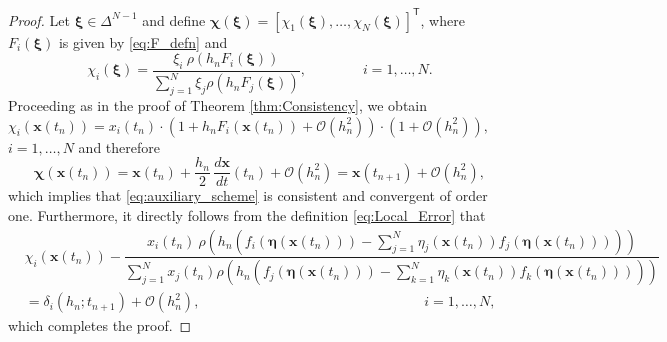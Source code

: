 \documentclass[11pt,letterpaper]{article}
\theoremstyle{remark}
\begin{document}
\begin{proof}
       Let $\bm{\xi}\in\Delta^{N-1}$ and define $\bm{\chi}(\bm{\xi})=[\chi_1(\bm{\xi}),\dots,\chi_N(\bm{\xi})]^\mathsf{T}$, where $F_i(\bm{\xi})$ is given by \eqref{eq:F_defn} and 
    \begin{equation*}
        \chi_i(\bm{\xi})=\dfrac{\xi_i \ \rho  \left( h_n F_i(\bm{\xi})\right)}{\sum_{j=1}^{N} \xi_j \rho  \left( h_n F_j(\bm{\xi})\right) }, \qquad \qquad i=1,\dots,N.
    \end{equation*}
        Proceeding as in the proof of Theorem \ref{thm:Consistency}, we obtain $\chi_i(\bm{x}(t_n))=x_i(t_n)\cdot (1 + h_n F_i(\bm{x}(t_n))+\mathcal{O}(h_n^2)) \cdot (1+\mathcal{O}(h_n^2)),$ $i=1,\dots,N$ and therefore
    \begin{equation*}
        \bm{\chi}(\bm{x}(t_n))=\bm{x}(t_n) + \frac{h_n}{2} \, \dfrac{d \bm{x}}{d t}(t_n) + \mathcal{O}(h_n^2)=\bm{x}(t_{n+1})+\mathcal{O}(h_n^2),
    \end{equation*}
        which implies that \eqref{eq:auxiliary_scheme} is consistent and convergent of order one. Furthermore, it directly follows from the definition \eqref{eq:Local_Error} that
    \begin{equation*}
        \begin{split}
        &\chi_i(\bm{x}(t_n))-\dfrac{x_i(t_n) \ \rho \! \left( \!  h_n \! \left( \! f_i(\bm{\eta}(\bm{x}(t_n))) - \displaystyle \sum_{j=1}^{N} \eta_j(\bm{x}(t_n)) f_j(\bm{\eta}(\bm{x}(t_n))) \right) \! \right)}{\displaystyle \sum_{j=1}^{N} x_j(t_n)  \rho \! \left( \! h_n \!\! \left( \! f_j(\bm{\eta}(\bm{x}(t_n))) \! - \!\! \displaystyle \sum_{k=1}^{N} \eta_k(\bm{x}(t_n)) f_k(\bm{\eta}(\bm{x}(t_n))) \! \right) \!\! \right) } \\ 
        &= \delta_i(h_n;t_{n+1})+\mathcal{O}(h_n^2), \qquad  \qquad\qquad\qquad\qquad \qquad\qquad \qquad i=1,\dots,N,
        \end{split}
    \end{equation*}
    which completes the proof.
\end{proof}
\end{document}
